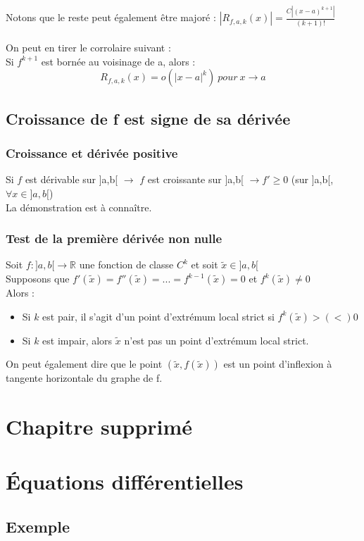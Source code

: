 \documentclass[11pt, a4paper, openany]{book}
\begin{document}
Notons que le reste peut également être majoré : $|R_{f, a, k}(x)| = \frac{C|(x-a)^{k+1}|}{(k+1)!}$\\\\
On peut en tirer le corrolaire suivant : \\
Si $f^{k+1}$  est bornée au voisinage de a, alors : 
$$R_{f, a, k}(x) = o(|x-a|^{k})\ pour\ x \rightarrow a $$

\section{Croissance de f est signe de sa dérivée}
\subsection{Croissance et dérivée positive}
Si $f$ est dérivable sur ]a,b[ $\rightarrow$ $f$ est croissante sur ]a,b[ $\rightarrow f' \geq 0$ (sur ]a,b[, $\forall x \in ]a,b[$)\\
La démonstration est à connaître.

\subsection{Test de la première dérivée non nulle}
Soit $f:]a,b[ \rightarrow \mathbb{R}$ une fonction de classe $C^{k}$ et soit $\tilde{x} \in ]a,b[$\\
Supposons que $f'(\tilde{x}) = f''(\tilde{x}) = ... = f^{k-1}(\tilde{x}) = 0 $ et $f^{k}(\tilde{x}) \neq 0$\\ Alors : 
\begin{itemize}
	\item Si $k$ est pair, il s'agit d'un point d'extrémum local strict si $f^{k}(\tilde{x}) >(<) 0 $
	\item Si $k$ est impair, alors $\tilde{x}$ n'est pas un point d'extrémum local strict.
\end{itemize}
On peut également dire que le point $(\tilde{x}, f(\tilde{x}))$ est un point d'inflexion à tangente horizontale du graphe de f.


\chapter{Chapitre supprimé}
\chapter{Équations différentielles}
\section{Exemple}
\end{document}
